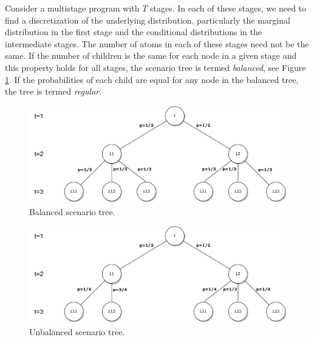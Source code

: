 Consider a multistage program with $T$ stages. In each of these stages, we need to find a discretization of the underlying distribution, particularly the marginal distribution in the first stage and the conditional distributions in the intermediate stages. The number of atoms in each of these stages need not be the same. If the number of children is the same for each node in a given stage and this property holds for all stages, the scenario tree is termed \textit{balanced}, see Figure \ref{fig:balanced_scenario_tree}. If the probabilities of each child are equal for any node in the balanced tree, the tree is termed \textit{regular}. 

\begin{figure}
  \includegraphics[width=\linewidth]{../img/scenario_tree_balanced.pdf}
  \caption{Balanced scenario tree.}
  \label{fig:balanced_scenario_tree}
\end{figure}


\begin{figure}
  \includegraphics[width=\linewidth]{../img/scenario_tree_unbalanced.pdf}
  \caption{Unbalanced scenario tree.}
  \label{fig:unbalanced_scenario_tree}
\end{figure}

